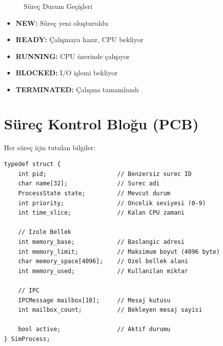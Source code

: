 \documentclass[12pt,a4paper]{report}
\begin{document}
\begin{figure}[h]
\centering
{}
\caption{Süreç Durum Geçişleri}
\end{figure}

\begin{itemize}
    \item \textbf{NEW:} Süreç yeni oluşturuldu
    \item \textbf{READY:} Çalışmaya hazır, CPU bekliyor
    \item \textbf{RUNNING:} CPU üzerinde çalışıyor
    \item \textbf{BLOCKED:} I/O işlemi bekliyor
    \item \textbf{TERMINATED:} Çalışma tamamlandı
\end{itemize}

\section{Süreç Kontrol Bloğu (PCB)}

Her süreç için tutulan bilgiler:

\begin{lstlisting}[caption={SimProcess Yapisi}]
typedef struct {
    int pid;                    // Benzersiz surec ID
    char name[32];              // Surec adi
    ProcessState state;         // Mevcut durum
    int priority;               // Oncelik seviyesi (0-9)
    int time_slice;             // Kalan CPU zamani
    
    // Izole Bellek
    int memory_base;            // Baslangic adresi
    int memory_limit;           // Maksimum boyut (4096 byte)
    char memory_space[4096];    // Ozel bellek alani
    int memory_used;            // Kullanilan miktar
    
    // IPC
    IPCMessage mailbox[10];     // Mesaj kutusu
    int mailbox_count;          // Bekleyen mesaj sayisi
    
    bool active;                // Aktif durumu
} SimProcess;
\end{lstlisting}
\end{document}
